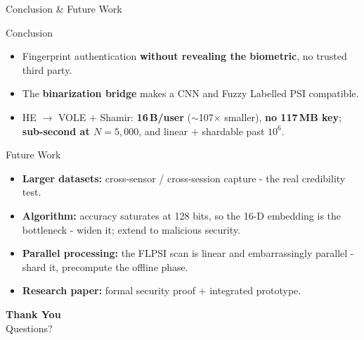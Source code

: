 \documentclass{beamer}
\begin{document}
\begin{frame}{Conclusion \& Future Work}
  \begin{block}{Conclusion}
    {\footnotesize
    \begin{itemize}\itemsep2pt
      \item Fingerprint authentication \textbf{without revealing the biometric}, no trusted third party.
      \item The \textbf{binarization bridge} makes a CNN and Fuzzy Labelled PSI compatible.
      \item HE $\to$ VOLE $+$ Shamir: \textbf{16\,B/user} ($\sim$107$\times$ smaller), \textbf{no 117\,MB key}; \textbf{sub-second at $N=5{,}000$}, and linear $+$ shardable past $10^6$.
    \end{itemize}}
  \end{block}

  \begin{block}{Future Work}
    {\footnotesize
    \begin{itemize}\itemsep2pt
      \item \textbf{Larger datasets:} cross-sensor / cross-session capture - the real credibility test.
      \item \textbf{Algorithm:} accuracy saturates at 128 bits, so the \alert{16-D embedding} is the bottleneck - widen it; extend to malicious security.
      \item \textbf{Parallel processing:} the FLPSI scan is linear and embarrassingly parallel - shard it, precompute the offline phase.
      \item \textbf{Research paper:} formal security proof $+$ integrated prototype.
    \end{itemize}}
  \end{block}
\end{frame}

\begin{frame}
  \centering
  \vspace{2cm}
  {\Huge \textbf{Thank You}} \\[1em]
  {\Large Questions?}
\end{frame}
\end{document}
